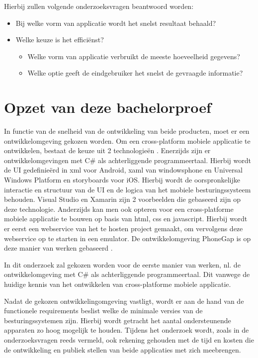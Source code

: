 Hierbij zullen volgende onderzoeksvragen beantwoord worden:
\begin{itemize}
  \item{Bij welke vorm van applicatie wordt het snelst resultaat behaald?}
  \item{Welke keuze is het efficiënst?}
  \begin{itemize}
    \item{Welke vorm van applicatie verbruikt de meeste hoeveelheid gegevens?}
    \item{Welke optie geeft de eindgebruiker het snelst de gevraagde informatie?}
  \end{itemize}
\end{itemize}
\newpage
\section{Opzet van deze bachelorproef}
\label{sec:opzet-bachelorproef}
In functie van de snelheid van de ontwikkeling van beide producten, moet er een ontwikkelomgeving gekozen worden.
Om een cross-platform mobiele applicatie te ontwikkelen, bestaat de keuze uit 2 technologieën . Enerzijds zijn er
ontwikkelomgevingen met C\# als achterliggende programmeertaal. Hierbij wordt de UI gedefinieërd in xml voor Android,
xaml van windowsphone en Universal Windows Platform en storyboards voor iOS. Hierbij wordt de oorspronkelijke interactie
en structuur van de UI en de logica van het mobiele besturingssysteem behouden. Visual Studio en Xamarin zijn 2 voorbeelden
die gebaseerd zijn op deze technologie. Anderzijds kan men ook opteren voor een cross-platforme mobiele applicatie te bouwen op basis van html, css en javascript.
Hierbij wordt er eerst een webservice van het te hosten project gemaakt, om vervolgens deze webservice op te starten in een emulator.
De ontwikkelomgeving PhoneGap is op deze manier van werken gebaseerd \citep{adobesystemsinc2017}.

In dit onderzoek zal gekozen worden voor de eerste manier van werken, nl. de ontwikkelomgeving met C\# als achterliggende
programmeertaal. Dit vanwege de huidige kennis van het ontwikkelen van cross-platforme mobiele applicatie.

Nadat de gekozen ontwikkelingomgeving vastligt, wordt er aan de hand van de functionele requirements beslist welke de
minimale versies van de besturingssystemen zijn. Hierbij wordt getracht het aantal ondersteunende apparaten zo hoog mogelijk te houden.
Tijdens het onderzoek wordt, zoals in de onderzoeksvragen reeds vermeld, ook rekening gehouden met de tijd en kosten die de ontwikkeling
en publiek stellen van beide applicaties met zich meebrengen.

